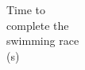 \documentclass[preview]{standalone}
\begin{document}
\begin{center}
Time to \\ complete the \\ swimming race \\ (s)
\end{center}
\end{document}
